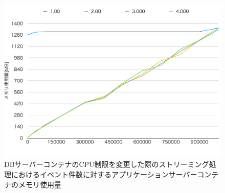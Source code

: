 \documentclass[../../../../../main]{subfiles}
\begin{document}
    \begin{figure}[H]
        \centering
        \includegraphics[width=12cm]{graph}
        \caption{DBサーバーコンテナのCPU制限を変更した際のストリーミング処理におけるイベント件数に対するアプリケーションサーバーコンテナのメモリ使用量}
        \label{fig:stream-change-db-cpu-limit-app-memory-app_4_8192-db_1024}
    \end{figure}
\end{document}

